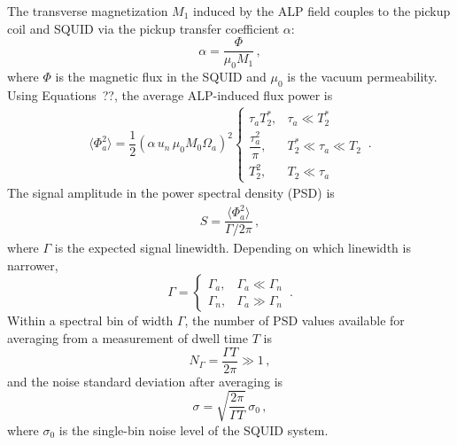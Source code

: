 The transverse magnetization $M_1$ induced by the ALP field couples to the pickup coil and SQUID via the pickup transfer coefficient $\alpha$:
\begin{equation}
    \alpha = \dfrac{\Phi}{\mu_0 M_1}
    \,,\label{eq:alpha}
\end{equation}
where $\Phi$ is the magnetic flux in the SQUID and $\mu_0$ is the vacuum permeability.
Using Equations~??, the average ALP-induced flux power is
\begin{align}
    \langle \Phi_a^2 \rangle
    =\dfrac{1}{2}(\alpha\, u_n\, \mu_0 M_0 \Omega_a)^2 \left\{
    \begin{array}{cl}
    \tau_a T_2^* ,
    &  \tau_a \ll T_2^*\\[6pt]
    \dfrac{\tau_a^2}{\pi} ,
    &  T_2^*\ll\tau_a \ll T_2\\[6pt]
    T_2^2 ,
    &  T_2 \ll \tau_a
    \end{array} \right.
    \,. \label{eq:Phia2}
\end{align}
The signal amplitude in the power spectral density (PSD) is
\begin{align}
    S = \dfrac{\langle \Phi_a^2 \rangle}{\Gamma /2\pi}
    \,, \label{eq:S_PSD}
\end{align}
where $\Gamma$ is the expected signal linewidth.
Depending on which linewidth is narrower,
\begin{equation}
    \Gamma = \left\{
    \begin{array}{cl}
    \Gamma_a ,
    &  \Gamma_a \ll \Gamma_{n}\\[4pt]
    \Gamma_{n},
    & \Gamma_a  \gg \Gamma_{n}
    \end{array} \right.
    \,.\label{eq:Gamma_signal}
\end{equation}
Within a spectral bin of width $\Gamma$, the number of PSD values available for averaging from a measurement of dwell time $T$ is
\begin{equation}
    N_{\Gamma} = \dfrac{\Gamma T}{2\pi} \gg 1
    \,,\label{eq:NGamma}
\end{equation}
and the noise standard deviation after averaging is
\begin{equation}
    \sigma = \sqrt{\dfrac{2\pi}{\Gamma T}}\,\sigma_{0}
    \,,\label{eq:sigma}
\end{equation}
where $\sigma_{0}$ is the single-bin noise level of the SQUID system.

